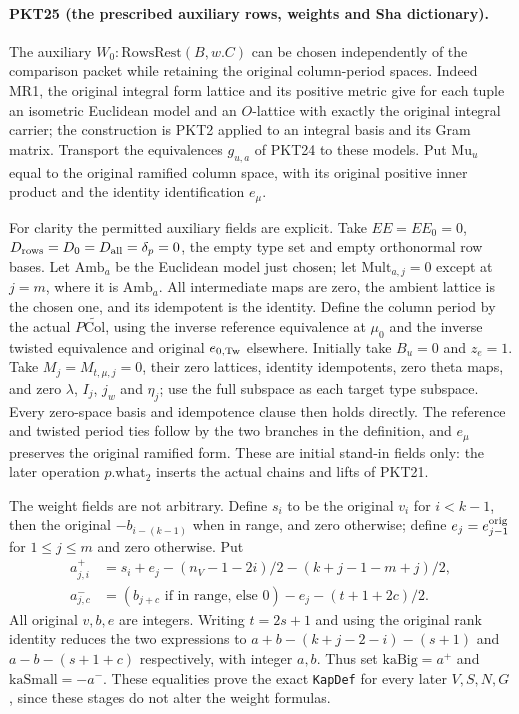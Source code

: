 \paragraph{PKT25 (the prescribed auxiliary rows, weights and Sha dictionary).}\label{claim:PKT25}
The auxiliary $W_0:\mathrm{RowsRest}(B,w.C)$ can be chosen independently
of the comparison packet while retaining the original column-period spaces.
Indeed MR1, the original integral form lattice and its positive metric give
for each tuple an isometric Euclidean model and an $O$-lattice with exactly
the original integral carrier; the construction is PKT2 applied to an
integral basis and its Gram matrix.  Transport the equivalences $g_{u,a}$
of PKT24 to these models.  Put $\mathrm{Mu}_u$ equal to the original
ramified column space, with its original positive inner product and the
identity identification $e_\mu$.

For clarity the permitted auxiliary fields are explicit.  Take $EE=EE_0=0$,
$D_{\rm rows}=D_0=D_{\rm all}=\delta_p=0$, the empty type set and empty
orthonormal row bases.  Let $\mathrm{Amb}_a$ be the Euclidean model just
chosen; let $\mathrm{Mult}_{a,j}=0$ except at $j=m$, where it is
$\mathrm{Amb}_a$.  All intermediate maps are zero, the ambient lattice
is the chosen one, and its idempotent is the identity.  Define the column
period by the actual $P\widetilde{\mathrm{Col}}$, using the inverse
reference equivalence at $\mu_0$ and the inverse twisted equivalence and
original $e_{0,\rm Tw}$ elsewhere.  Initially take $B_u=0$ and $z_e=1$.
Take $M_j=M_{t,\mu,j}=0$, their zero lattices, identity idempotents,
zero theta maps, and zero $\lambda$, $I_j$, $j_w$ and $\eta_j$; use the
full subspace as each target type subspace.  Every zero-space basis and
idempotence clause then holds directly.  The reference and twisted period
ties follow by the two branches in the definition, and $e_\mu$ preserves
the original ramified form.  These are initial stand-in fields only: the
later operation $p.\mathrm{what}_2$ inserts the actual chains and lifts
of PKT21.

The weight fields are not arbitrary.  Define $s_i$ to be the original
$v_i$ for $i<k-1$, then the original $-b_{i-(k-1)}$ when in range, and
zero otherwise; define $e_j=e_{j-1}^{\rm orig}$ for $1\le j\le m$ and
zero otherwise.  Put
\[
\begin{split}
 a^+_{j,i}&=s_i+e_j-(n_V-1-2i)/2-(k+j-1-m+j)/2,\\
 a^-_{j,c}&=(b_{j+c}\text{ if in range, else }0)-e_j-(t+1+2c)/2.
\end{split}\tag{PKT.26}
\]
All original $v,b,e$ are integers.  Writing $t=2s+1$ and using the
original rank identity reduces the two expressions to
$a+b-(k+j-2-i)-(s+1)$ and $a-b-(s+1+c)$ respectively, with integer
$a,b$.  Thus set $\mathrm{kaBig}=a^+$ and
$\mathrm{kaSmall}=-a^-$.  These equalities prove the exact
\texttt{KapDef} for every later $V,S,N,G$, since these stages do not
alter the weight formulas.

